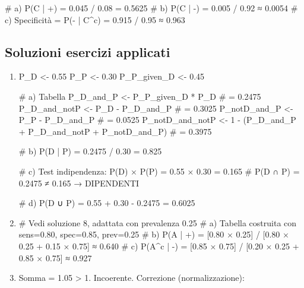 \documentclass[
  italian,
  letterpaper,
  a4paper,
  11pt,
  open=any]{scrbook}
\newenvironment{Shaded}{\begin{snugshade}}{\end{snugshade}}
\newcommand{\CommentTok}[1]{\textcolor[rgb]{0.37,0.37,0.37}{#1}}
\newcommand{\DecValTok}[1]{\textcolor[rgb]{0.68,0.00,0.00}{#1}}
\newcommand{\FloatTok}[1]{\textcolor[rgb]{0.68,0.00,0.00}{#1}}
\newcommand{\NormalTok}[1]{\textcolor[rgb]{0.00,0.23,0.31}{#1}}
\newcommand{\OtherTok}[1]{\textcolor[rgb]{0.00,0.23,0.31}{#1}}
\newcommand{\SpecialCharTok}[1]{\textcolor[rgb]{0.37,0.37,0.37}{#1}}
\theoremstyle{plain}
\theoremstyle{definition}
\theoremstyle{definition}
\theoremstyle{remark}
\begin{document}
\begin{tcolorbox}
\begin{enumerate}
\begin{Shaded}
\begin{Highlighting}[]
\CommentTok{\# a) P(C | +) = 0.045 / 0.08 = 0.5625}
\CommentTok{\# b) P(C | {-}) = 0.005 / 0.92 ≈ 0.0054}
\CommentTok{\# c) Specificità = P({-} | C\^{}c) = 0.915 / 0.95 ≈ 0.963}
\end{Highlighting}
\end{Shaded}
\end{enumerate}

\subsection{Soluzioni esercizi
applicati}\label{soluzioni-esercizi-applicati}

\begin{enumerate}
\def\labelenumi{\arabic{enumi}.}
\setcounter{enumi}{9}
\item
\begin{Shaded}
\begin{Highlighting}[]
\NormalTok{P\_D }\OtherTok{\textless{}{-}} \FloatTok{0.55}
\NormalTok{P\_P }\OtherTok{\textless{}{-}} \FloatTok{0.30}
\NormalTok{P\_P\_given\_D }\OtherTok{\textless{}{-}} \FloatTok{0.45}

\CommentTok{\# a) Tabella}
\NormalTok{P\_D\_and\_P }\OtherTok{\textless{}{-}}\NormalTok{ P\_P\_given\_D }\SpecialCharTok{*}\NormalTok{ P\_D  }\CommentTok{\# = 0.2475}
\NormalTok{P\_D\_and\_notP }\OtherTok{\textless{}{-}}\NormalTok{ P\_D }\SpecialCharTok{{-}}\NormalTok{ P\_D\_and\_P  }\CommentTok{\# = 0.3025}
\NormalTok{P\_notD\_and\_P }\OtherTok{\textless{}{-}}\NormalTok{ P\_P }\SpecialCharTok{{-}}\NormalTok{ P\_D\_and\_P  }\CommentTok{\# = 0.0525}
\NormalTok{P\_notD\_and\_notP }\OtherTok{\textless{}{-}} \DecValTok{1} \SpecialCharTok{{-}}\NormalTok{ (P\_D\_and\_P }\SpecialCharTok{+}\NormalTok{ P\_D\_and\_notP }\SpecialCharTok{+}\NormalTok{ P\_notD\_and\_P)  }\CommentTok{\# = 0.3975}

\CommentTok{\# b) P(D | P) = 0.2475 / 0.30 = 0.825}

\CommentTok{\# c) Test indipendenza: P(D) × P(P) = 0.55 × 0.30 = 0.165}
\CommentTok{\#    P(D ∩ P) = 0.2475 ≠ 0.165 → DIPENDENTI}

\CommentTok{\# d) P(D ∪ P) = 0.55 + 0.30 {-} 0.2475 = 0.6025}
\end{Highlighting}
\end{Shaded}
\item
\begin{Shaded}
\begin{Highlighting}[]
\CommentTok{\# Vedi soluzione 8, adattata con prevalenza 0.25}
\CommentTok{\# a) Tabella costruita con sens=0.80, spec=0.85, prev=0.25}
\CommentTok{\# b) P(A | +) = [0.80 × 0.25] / [0.80 × 0.25 + 0.15 × 0.75] ≈ 0.640}
\CommentTok{\# c) P(A\^{}c | {-}) = [0.85 × 0.75] / [0.20 × 0.25 + 0.85 × 0.75] ≈ 0.927}
\end{Highlighting}
\end{Shaded}
\item
  Somma = 1.05 \textgreater{} 1. Incoerente. Correzione
  (normalizzazione):


\end{enumerate}
\end{tcolorbox}
\end{document}

